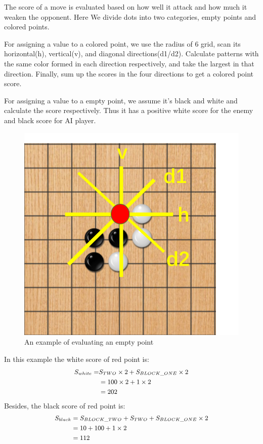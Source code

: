 \documentclass[a4paper, 11pt]{article} %
\begin{document}
\begin{multicols}{2}
	The score of a move is evaluated based on how well it attack and how much it weaken the opponent. Here We divide dots into two categories, empty points and colored points.
	
	For assigning a value to a colored point, we use the radius of 6 grid, scan its horizontal(h), vertical(v), and diagonal directions(d1/d2). Calculate patterns with the same color formed in each direction respectively, and take the largest in that direction. Finally, sum up the scores in the four directions to get a colored point score.
	
	For assigning a value to a empty point, we assume it's black and white and calculate the score respectively. Thus it has a positive white score for the enemy and black score for AI player.
	\begin{figure}[H]
		\centering
		\includegraphics[scale=0.4]{example.png}
		\caption{An example of evaluating an empty point }
		\label{figure}
	\end{figure}
	In this example the white score of red point is:
	$$
	\begin{small}
		\begin{aligned}
			S_{white} =& S_{TWO}\times 2+S_{BLOCK\_ONE}\times 2\\ &= 100\times 2+1\times 2\\ &= 202
		\end{aligned}
	\end{small}
	$$
	Besides, the black score of red point is:
	$$
	\begin{small}
		\begin{aligned}
			S_{black} &= S_{BLOCK\_TWO}+S_{TWO}+S_{BLOCK\_ONE}\times 2\\ &= 10+100+1\times 2\\ &= 112
		\end{aligned}
	\end{small}
	$$
	

\end{multicols}
\end{document}
